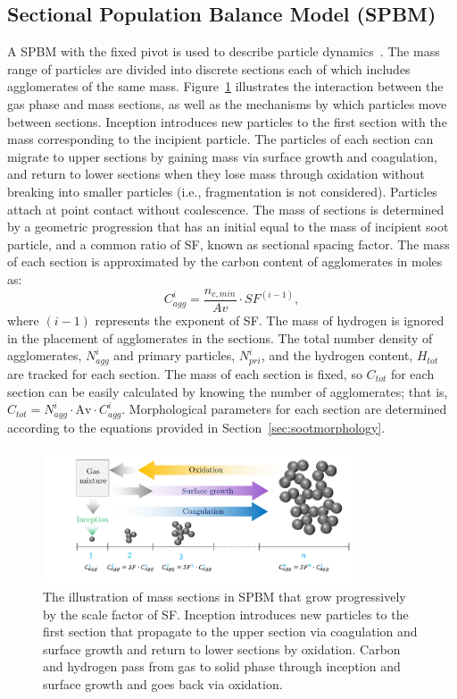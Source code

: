 \subsection{Sectional Population Balance Model (SPBM)}
A SPBM with the fixed pivot is used to describe particle dynamics~\citep{wu1988discrete}. The mass range of particles are divided into discrete sections each of which includes agglomerates of the same mass. Figure~\ref{fig:sectional} illustrates the interaction between the gas phase and mass sections, as well as the mechanisms by which particles move between sections. Inception introduces new particles to the first section with the mass corresponding to the incipient particle. The particles of each section can migrate to upper sections by gaining mass via surface growth and coagulation, and return to lower sections when they lose mass through oxidation without breaking into smaller particles (i.e., fragmentation is not considered). Particles attach at point contact without coalescence. The mass of sections is determined by a geometric progression that has an initial equal to the mass of incipient soot particle, and a common ratio of SF, known as sectional spacing factor. The mass of each section is approximated by the carbon content of agglomerates in moles as:
\begin{equation}
	C^i_{agg} = \frac{n_{c,min}}{Av}\cdot SF^{(i-1)},
	\label{eqn:Caggsec}
\end{equation}
\noindent where $(i-1)$ represents the exponent of SF. The mass of hydrogen is ignored in the placement of agglomerates in the sections.
The total number density of agglomerates, $N^i_{agg}$ and primary particles, ${N^i_{pri}}$, and the hydrogen content, $H_{tot}$ are tracked for each section. The mass of each section is fixed, so $C_{tot}$ for each section can be easily calculated by knowing the number of agglomerates; that is, $C_{tot} = N^i_{agg} \cdot \mathrm{Av} \cdot C^i_{agg}$. Morphological parameters for each section are determined according to the equations provided in Section~\ref{sec:sootmorphology}.


\begin{figure}[!htbp]
	\centering
	\includegraphics[height=40mm, ]{Figures/Theory/Sectional.pdf}
	\caption{The illustration of mass sections in SPBM that grow progressively by the scale factor of SF. Inception introduces new particles to the first section that propagate to the upper section via coagulation and surface growth and return to lower sections by oxidation. Carbon and hydrogen pass from gas to solid phase through inception and surface growth and goes back via oxidation.}
	\label{fig:sectional}
\end{figure}
 
